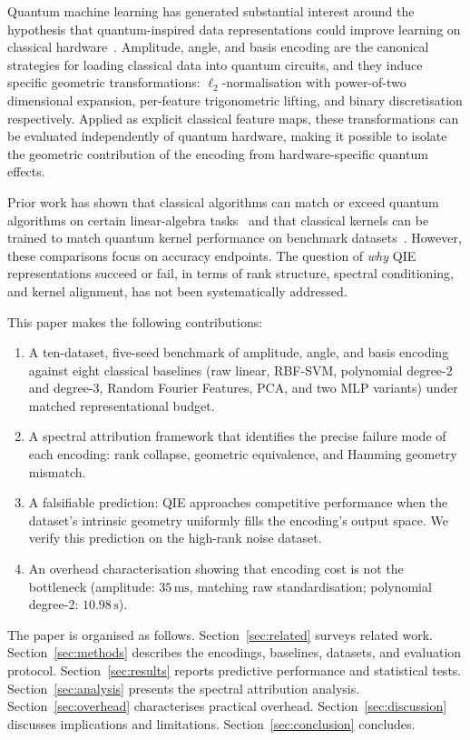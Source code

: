 \documentclass[12pt]{article}
\begin{document}
Quantum machine learning has generated substantial interest around the
hypothesis that quantum-inspired data representations could improve learning
on classical hardware~\citep{havlicek2019,schuld2019}.
Amplitude, angle, and basis encoding are the canonical strategies for loading
classical data into quantum circuits, and they induce specific geometric
transformations: $\ell_2$-normalisation with power-of-two dimensional
expansion, per-feature trigonometric lifting, and binary discretisation
respectively.
Applied as explicit classical feature maps, these transformations can be
evaluated independently of quantum hardware, making it possible to isolate the
geometric contribution of the encoding from hardware-specific quantum effects.

Prior work has shown that classical algorithms can match or exceed quantum
algorithms on certain linear-algebra tasks~\citep{tang2019} and that classical
kernels can be trained to match quantum kernel performance on benchmark
datasets~\citep{kubler2021,huang2021}.
However, these comparisons focus on accuracy endpoints.
The question of \emph{why} QIE representations succeed or fail, in terms of
rank structure, spectral conditioning, and kernel alignment, has not been
systematically addressed.

This paper makes the following contributions:
\begin{enumerate}
  \item A ten-dataset, five-seed benchmark of amplitude, angle, and basis
        encoding against eight classical baselines (raw linear, RBF-SVM,
        polynomial degree-2 and degree-3, Random Fourier Features, PCA,
        and two MLP variants) under matched representational budget.
  \item A spectral attribution framework that identifies the precise failure
        mode of each encoding: rank collapse, geometric equivalence, and
        Hamming geometry mismatch.
  \item A falsifiable prediction: QIE approaches competitive performance when
        the dataset's intrinsic geometry uniformly fills the encoding's output
        space.  We verify this prediction on the high-rank noise dataset.
  \item An overhead characterisation showing that encoding cost is not the
        bottleneck (amplitude: $35\,\mathrm{ms}$, matching raw standardisation;
        polynomial degree-2: $10.98\,\mathrm{s}$).
\end{enumerate}

The paper is organised as follows.
Section~\ref{sec:related} surveys related work.
Section~\ref{sec:methods} describes the encodings, baselines, datasets,
and evaluation protocol.
Section~\ref{sec:results} reports predictive performance and statistical tests.
Section~\ref{sec:analysis} presents the spectral attribution analysis.
Section~\ref{sec:overhead} characterises practical overhead.
Section~\ref{sec:discussion} discusses implications and limitations.
Section~\ref{sec:conclusion} concludes.
\end{document}
